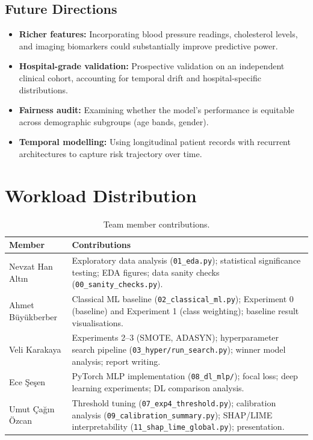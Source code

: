 \documentclass[11pt,a4paper]{article}
\begin{document}
\subsection{Future Directions}

\begin{itemize}
  \item \textbf{Richer features:} Incorporating blood pressure readings, cholesterol levels, and imaging biomarkers could substantially improve predictive power.
  \item \textbf{Hospital-grade validation:} Prospective validation on an independent clinical cohort, accounting for temporal drift and hospital-specific distributions.
  \item \textbf{Fairness audit:} Examining whether the model's performance is equitable across demographic subgroups (age bands, gender).
  \item \textbf{Temporal modelling:} Using longitudinal patient records with recurrent architectures to capture risk trajectory over time.
\end{itemize}

\section{Workload Distribution}
\label{sec:workload}

\begin{table}[H]
  \centering
  \caption{Team member contributions.}
  \label{tab:workload}
  \renewcommand{\arraystretch}{1.15}
  \begin{tabular}{lp{10cm}}
    \toprule
    \textbf{Member} & \textbf{Contributions} \\
    \midrule
    Nevzat Han Alt\i{}n &
      Exploratory data analysis (\texttt{01\_eda.py}); statistical significance testing; EDA figures; data sanity checks (\texttt{00\_sanity\_checks.py}). \\
    \addlinespace
    Ahmet B\"uy\"ukberber &
      Classical ML baseline (\texttt{02\_classical\_ml.py}); Experiment 0 (baseline) and Experiment 1 (class weighting); baseline result visualisations. \\
    \addlinespace
    Veli Karakaya &
      Experiments 2–3 (SMOTE, ADASYN); hyperparameter search pipeline (\texttt{03\_hyper/run\_search.py}); winner model analysis; report writing. \\
    \addlinespace
    Ece \c{S}e\c{s}en &
      PyTorch MLP implementation (\texttt{08\_dl\_mlp/}); focal loss; deep learning experiments; DL comparison analysis. \\
    \addlinespace
    Umut \c{C}a\u{g}\i{}n \"Ozcan &
      Threshold tuning (\texttt{07\_exp4\_threshold.py}); calibration analysis (\texttt{09\_calibration\_summary.py}); SHAP/LIME interpretability (\texttt{11\_shap\_lime\_global.py}); presentation. \\
    \bottomrule
  \end{tabular}
\end{table}
\end{document}
